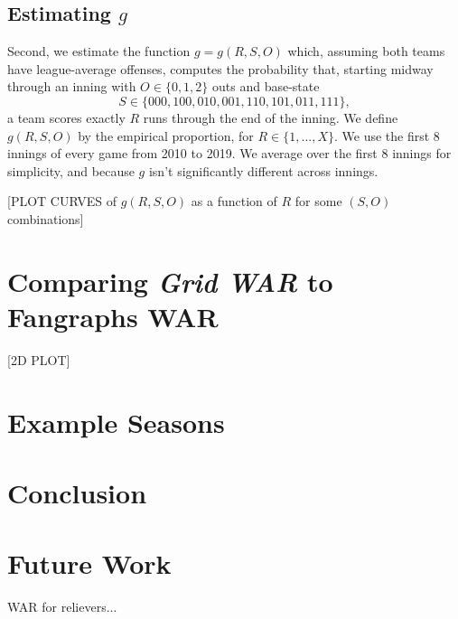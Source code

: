 \documentclass[12pt]{article}
\begin{document}
\subsection{Estimating $g$}

Second, we estimate the function $g=g(R,S,O)$ which, assuming both teams have league-average offenses, computes the probability that, starting midway through an inning with $O \in \{0,1,2\}$ outs and base-state 
$$S \in \{000,100,010,001,110,101,011,111\},$$
a team scores exactly $R$ runs through the end of the inning. We define $g(R,S,O)$ by the empirical proportion, for $R \in \{1,...,X\}$. We use the first 8 innings of every game from 2010 to 2019. We average over the first 8 innings for simplicity, and because $g$ isn't significantly different across innings. 

[PLOT CURVES of $g(R,S,O)$ as a function of $R$ for some $(S,O)$ combinations]

\section{Comparing \textit{Grid WAR} to Fangraphs WAR}

[2D PLOT]



\section{Example Seasons}



\section{Conclusion}



\section{Future Work}
WAR for relievers...


 \clearpage
 
 
\end{document}
